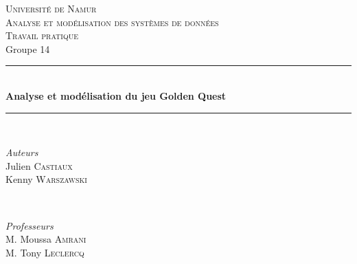\documentclass[11pt]{article}
\begin{document}

\begin{titlepage} %
	\newcommand{\HRule}{\rule{\linewidth}{0.5mm}} %
	
	\center %
	
	
	\textsc{\LARGE Université de Namur}\\[1.5cm] %
	
	\textsc{\Large Analyse et modélisation des systèmes de données}\\[0.5cm] %
	
	\textsc{\large Travail pratique}\\Groupe 14\\[0.5cm] %
	
	
	\HRule\\[0.4cm]
	
	{\huge\bfseries Analyse et modélisation du jeu Golden Quest}\\[0.4cm] %
	
	\HRule\\[1.5cm]
	
	
	\begin{minipage}{0.4\textwidth}
		\begin{flushleft}
			\textit{Auteurs}\\
			\large Julien \textsc{Castiaux}
			\\
			\large Kenny \textsc{Warszawski}
		\end{flushleft}

	\end{minipage}
	~
	\begin{minipage}{0.4\textwidth}
		\begin{flushright}
			\large
			\textit{Professeurs}\\
			M. Moussa \textsc{Amrani}\\
			M. Tony \textsc{Leclercq}
		\end{flushright}
	\end{minipage}
	

\end{titlepage}
\end{document}
